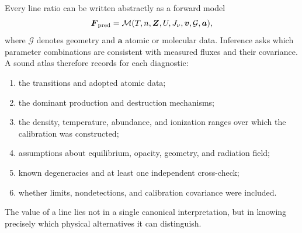 Every line ratio can be written abstractly as a forward model
\begin{equation}
 \boldsymbol{F}_{\rm pred}=
 \mathcal{M}(T,n,\boldsymbol{Z},U,J_\nu,\boldsymbol{v},\mathcal{G},
 \boldsymbol{a}),
 \label{eq:diagnostic-forward-model}
\end{equation}
where $\mathcal{G}$ denotes geometry and $\boldsymbol{a}$ atomic or molecular data.
Inference asks which parameter combinations are consistent with measured fluxes and
their covariance.  A sound atlas therefore records for each diagnostic:
\begin{enumerate}
 \item the transitions and adopted atomic data;
 \item the dominant production and destruction mechanisms;
 \item the density, temperature, abundance, and ionization ranges over which the
 calibration was constructed;
 \item assumptions about equilibrium, opacity, geometry, and radiation field;
 \item known degeneracies and at least one independent cross-check;
 \item whether limits, nondetections, and calibration covariance were included.
\end{enumerate}
The value of a line lies not in a single canonical interpretation, but in knowing
precisely which physical alternatives it can distinguish.
